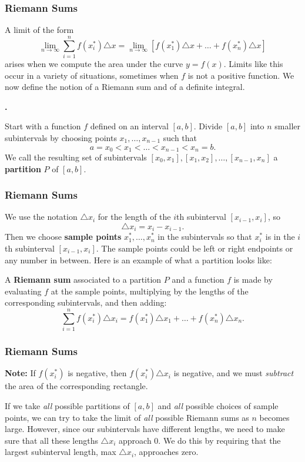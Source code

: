 \documentclass[t]{beamer}
\theoremstyle{plain}
\theoremstyle{definition}
\newcounter{heading}
\newcommand{\newhead}[1]{\medskip\stepcounter{heading}\noindent\textbf{\hspace{0.2cm}{#1}.}}
\begin{document}
\begin{frame}
\frametitle{Riemann Sums}
\noindent A limit of the form
\[ \lim_{n\rightarrow \infty}\sum_{i=1}^{n}f(x_{i}^{*})\triangle x = \lim_{n\rightarrow \infty}[f(x_{1}^{*})\triangle x + \ldots + f(x_{n}^{*})\triangle x]\]
arises when we compute the area under the curve $y=f(x)$.  Limits like this occur in a variety of situations, sometimes when $f$ is not a positive function.  We now define the notion of a Riemann sum and of a definite integral.\pause

\newhead{Riemann sums}

\noindent Start with a function $f$ defined on an interval $[a,b]$.  Divide $[a,b]$ into $n$ smaller subintervals by choosing points $x_{1},\ldots, x_{n-1}$ such that
\[a = x_{0} < x_{1} < \ldots < x_{n-1} < x_{n} = b.\]
We call the resulting set of subintervals 
$[x_{0},x_{1}], [x_{1},x_{2}],\ldots, [x_{n-1},x_{n}] $ a \textbf{partition} $P$ of $[a,b]$.


\end{frame}

\begin{frame}
\frametitle{Riemann Sums}
\noindent We use the notation $\triangle x_{i}$ for the length of the $i$th subinterval $[x_{i-1},x_{i}]$, so \[\triangle x_{i} = x_{i} - x_{i-1}.\]\pause
Then we choose \textbf{sample points} $x_{1}^{*},\ldots, x_{n}^{*}$ in the subintervals so that $x_{i}^{*}$ is in the $i$th subinterval $[x_{i-1},x_{i}]$.  The sample points could be left or right endpoints or any number in between.  Here is an example of what a partition looks like:\pause

\vspace*{.3cm}

\noindent A \textbf{Riemann sum} associated to a partition $P$ and a function $f$ is made by evaluating $f$ at the sample points, multiplying by the lengths of the corresponding subintervals, and then adding:
\[ \sum_{i=1}^{n}f(x_{i}^{*})\triangle x_{i} = f(x_{1}^{*})\triangle x_{1} + \ldots + f(x_{n}^{*})\triangle x_{n}.\]
\end{frame}

\begin{frame}
\frametitle{Riemann Sums}
\noindent \textbf{Note:} If $f(x_{i}^{*})$ is negative, then $f(x_{i}^{*})\triangle x_{i}$ is negative, and we must \emph{subtract} the area of the corresponding rectangle.\pause

\medskip

\noindent If we take \emph{all} possible partitions of $[a,b]$ and \emph{all} possible choices of sample points, we can try to take the limit of \emph{all} possible Riemann sums as $n$ becomes large.  However, since our subintervals have different lengths, we need to make sure that all these lengths $\triangle x_{i}$ approach $0$.  We do this by requiring that the largest subinterval length, max $\triangle x_{i}$, approaches zero.
\end{frame}
\end{document}
